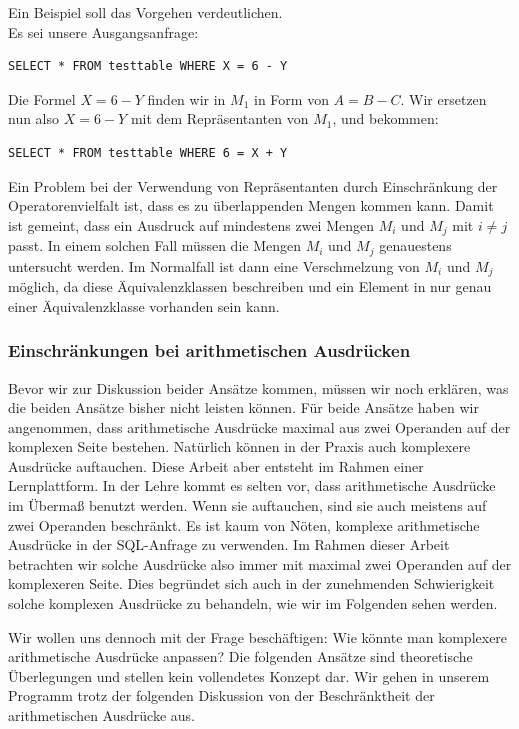 Ein Beispiel soll das Vorgehen verdeutlichen.\\
Es sei unsere Ausgangsanfrage: \begin{verbatim}SELECT * FROM testtable WHERE X = 6 - Y\end{verbatim}

Die Formel $X=6-Y$ finden wir in $M_1$ in Form von $A=B-C$. Wir ersetzen nun also $X=6-Y$ mit dem Repräsentanten von $M_1$, und bekommen: \begin{verbatim}SELECT * FROM testtable WHERE 6 = X + Y\end{verbatim}

Ein Problem bei der Verwendung von Repräsentanten durch Einschränkung der Operatorenvielfalt ist, dass es zu überlappenden Mengen kommen kann. Damit ist gemeint, dass ein Ausdruck auf mindestens zwei Mengen $M_i$ und $M_j$ mit $i\neq j$ passt. In einem solchen Fall müssen die Mengen $M_i$ und $M_j$ genauestens untersucht werden. Im Normalfall ist dann eine Verschmelzung von $M_i$ und $M_j$ möglich, da diese Äquivalenzklassen beschreiben und ein Element in nur genau einer Äquivalenzklasse vorhanden sein kann.

\subsubsection{Einschränkungen bei arithmetischen Ausdrücken}
\label{subsubsec:arithmetic}

Bevor wir zur Diskussion beider Ansätze kommen, müssen wir noch erklären, was die beiden Ansätze bisher nicht leisten können. Für beide Ansätze haben wir angenommen, dass arithmetische Ausdrücke maximal aus zwei Operanden auf der komplexen Seite bestehen. Natürlich können in der Praxis auch komplexere Ausdrücke auftauchen. Diese Arbeit aber entsteht im Rahmen einer Lernplattform. In der Lehre kommt es selten vor, dass arithmetische Ausdrücke im Übermaß benutzt werden. Wenn sie auftauchen, sind sie auch meistens auf zwei Operanden beschränkt. Es ist kaum von Nöten, komplexe arithmetische Ausdrücke in der SQL-Anfrage zu verwenden. Im Rahmen dieser Arbeit betrachten wir solche Ausdrücke also immer mit maximal zwei Operanden auf der komplexeren Seite. Dies begründet sich auch in der zunehmenden Schwierigkeit solche komplexen Ausdrücke zu behandeln, wie wir im Folgenden sehen werden.

Wir wollen uns dennoch mit der Frage beschäftigen: Wie könnte man komplexere arithmetische Ausdrücke anpassen? Die folgenden Ansätze sind theoretische Überlegungen und stellen kein vollendetes Konzept dar. Wir gehen in unserem Programm trotz der folgenden Diskussion von der Beschränktheit der arithmetischen Ausdrücke aus.

